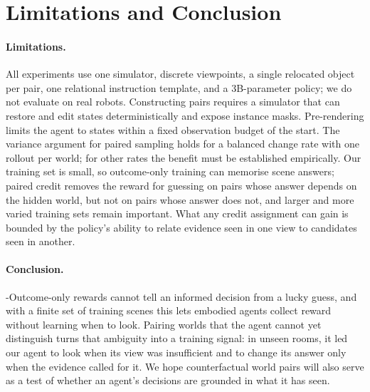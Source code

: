 \section{Limitations and Conclusion}
\label{sec:conclusion}

\paragraph{Limitations.}
All experiments use one simulator, discrete viewpoints, a single relocated object per pair, one relational instruction template, and a 3B-parameter policy; we do not evaluate on real robots.
Constructing pairs requires a simulator that can restore and edit states deterministically and expose instance masks.
Pre-rendering limits the agent to states within a fixed observation budget of the start.
The variance argument for paired sampling holds for a balanced change rate with one rollout per world; for other rates the benefit must be established empirically.
Our training set is small, so outcome-only training can memorise scene answers; paired credit removes the reward for guessing on pairs whose answer depends on the hidden world, but not on pairs whose answer does not, and larger and more varied training sets remain important.
What any credit assignment can gain is bounded by the policy's ability to relate evidence seen in one view to candidates seen in another.

\paragraph{Conclusion.}
\hyp{Outcome-only rewards cannot tell an informed decision from a lucky guess, and with a finite set of training scenes this lets embodied agents collect reward without learning when to look.
Pairing worlds that the agent cannot yet distinguish turns that ambiguity into a training signal: in unseen rooms, it led our agent to look when its view was insufficient and to change its answer only when the evidence called for it.
We hope counterfactual world pairs will also serve as a test of whether an agent's decisions are grounded in what it has seen.}
